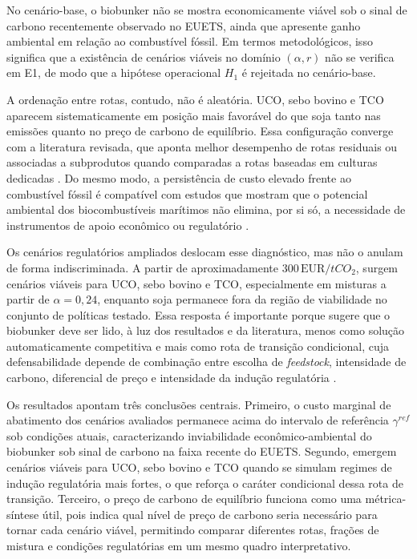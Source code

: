 No cenário-base, o biobunker não se mostra economicamente viável sob o sinal de carbono recentemente observado no \gls{EUETS}, ainda que apresente ganho ambiental em relação ao combustível fóssil. Em termos metodológicos, isso significa que a existência de cenários viáveis no domínio $(\alpha,r)$ não se verifica em E1, de modo que a hipótese operacional $H_1$ é rejeitada no cenário-base.

A ordenação entre rotas, contudo, não é aleatória. \gls{UCO}, sebo bovino e \gls{TCO} aparecem sistematicamente em posição mais favorável do que soja tanto nas emissões quanto no preço de carbono de equilíbrio. Essa configuração converge com a literatura revisada, que aponta melhor desempenho de rotas residuais ou associadas a subprodutos quando comparadas a rotas baseadas em culturas dedicadas \citep{bilgili_comparative_2021,cesilla_de_souza_technical-economic_2024,carvalho_biofuels_2021}. Do mesmo modo, a persistência de custo elevado frente ao combustível fóssil é compatível com estudos que mostram que o potencial ambiental dos biocombustíveis marítimos não elimina, por si só, a necessidade de instrumentos de apoio econômico ou regulatório \citep{tan_economic_2019,lindstad_reduction_2021,cesilla_de_souza_technical-economic_2024}.

Os cenários regulatórios ampliados deslocam esse diagnóstico, mas não o anulam de forma indiscriminada. A partir de aproximadamente $300\,\text{EUR}/tCO_2$, surgem cenários viáveis para \gls{UCO}, sebo bovino e \gls{TCO}, especialmente em misturas a partir de $\alpha = 0{,}24$, enquanto soja permanece fora da região de viabilidade no conjunto de políticas testado. Essa resposta é importante porque sugere que o biobunker deve ser lido, à luz dos resultados e da literatura, menos como solução automaticamente competitiva e mais como rota de transição condicional, cuja defensabilidade depende de combinação entre escolha de \emph{feedstock}, intensidade de carbono, diferencial de preço e intensidade da indução regulatória \citep{lindstad_reduction_2021,kanchiralla_role_2024,carvalho_biofuels_2021}.

Os resultados apontam três conclusões centrais. Primeiro, o custo marginal de abatimento dos cenários avaliados permanece acima do intervalo de referência $\gamma^{ref}$ sob condições atuais, caracterizando inviabilidade econômico-ambiental do biobunker sob sinal de carbono na faixa recente do \gls{EUETS}. Segundo, emergem cenários viáveis para \gls{UCO}, sebo bovino e \gls{TCO} quando se simulam regimes de indução regulatória mais fortes, o que reforça o caráter condicional dessa rota de transição. Terceiro, o preço de carbono de equilíbrio funciona como uma métrica-síntese útil, pois indica qual nível de preço de carbono seria necessário para tornar cada cenário viável, permitindo comparar diferentes rotas, frações de mistura e condições regulatórias em um mesmo quadro interpretativo.
